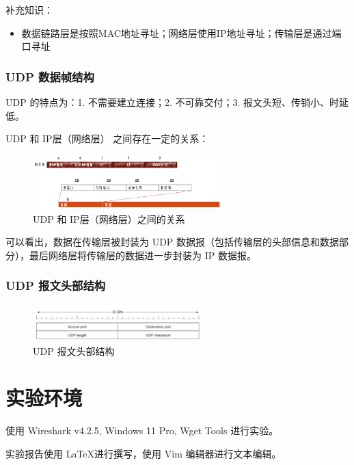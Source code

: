 \documentclass[14pt,a4paper,UTF8,twoside]{article}
\begin{document}
补充知识：

\begin{itemize}
    \item 数据链路层是按照MAC地址寻址；网络层使用IP地址寻址；传输层是通过端口寻址
\end{itemize}

\subsubsection{UDP 数据帧结构}

UDP 的特点为：1. 不需要建立连接；2. 不可靠交付；3. 报文头短、传销小、时延低。

UDP 和 IP层（网络层） 之间存在一定的关系：

\begin{figure}[H]
    \centering
    \includegraphics[width=0.65\textwidth]{lab5/udp_ip.png}
    \caption{UDP 和 IP层（网络层）之间的关系}
    \label{fig:udp_ip}
\end{figure}

可以看出，数据在传输层被封装为 UDP 数据报（包括传输层的头部信息和数据部分），最后网络层将传输层的数据进一步封装为 IP 数据报。

\subsubsection*{UDP 报文头部结构}

\begin{figure}[H]
    \centering
    \includegraphics[width=0.6\textwidth]{lab5/udp_header.png}
    \caption{UDP 报文头部结构}
    \label{fig:udp_header}
\end{figure}


\section{实验环境}

使用 Wireshark v4.2.5, Windows 11 Pro, Wget Tools 进行实验。

实验报告使用 \LaTeX 进行撰写，使用 Vim 编辑器进行文本编辑。
\end{document}
